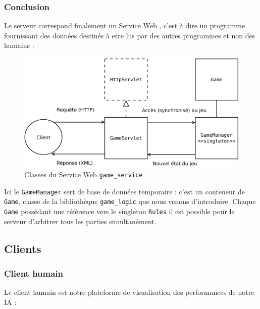 \subsubsection{Conclusion}
Le serveur correspond finalement un \og Service Web \fg{}, c'est à dire un programme fournissant des données destinés à etre lus par des autres programmes et non des humains :
\begin{figure}[H] 
\centering
\includegraphics[width=\textwidth]{files/env/game_service} 
\caption{Classes du Service Web \texttt{game\_service}} 
\label{game_service}
\end{figure}
Ici le \texttt{GameManager} sert de base de données temporaire : c'est un conteneur de \texttt{Game}, classe de la bibliothèque \texttt{game\_logic} que nous venons d'introduire. Chaque \texttt{Game} possédant une référence vers le singleton \texttt{Rules} il est possible pour le serveur d'arbitrer tous les parties simultanément.

\subsection{Clients}

\subsubsection{Client humain}
Le client humain est notre plateforme de visualisation des performances de notre IA :

